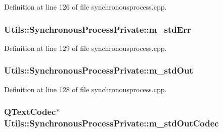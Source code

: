 Definition at line 126 of file synchronousprocess.\-cpp.

\hypertarget{struct_utils_1_1_synchronous_process_private_a91f0119521a74e8a136b01fee2e6bc2c}{
\subsubsection[{m\-\_\-std\-Err}]{ Utils\-::\-Synchronous\-Process\-Private\-::m\-\_\-std\-Err}}\label{struct_utils_1_1_synchronous_process_private_a91f0119521a74e8a136b01fee2e6bc2c}


Definition at line 129 of file synchronousprocess.\-cpp.

\hypertarget{struct_utils_1_1_synchronous_process_private_a619a54cc495542f58dba37ea569d02df}{
\subsubsection[{m\-\_\-std\-Out}]{ Utils\-::\-Synchronous\-Process\-Private\-::m\-\_\-std\-Out}}\label{struct_utils_1_1_synchronous_process_private_a619a54cc495542f58dba37ea569d02df}


Definition at line 128 of file synchronousprocess.\-cpp.

\hypertarget{struct_utils_1_1_synchronous_process_private_ae309539275cdf8ecf4189526058d2cb6}{
\subsubsection[{m\-\_\-std\-Out\-Codec}]{\setlength{\rightskip}{0pt plus 5cm}Q\-Text\-Codec$\ast$ Utils\-::\-Synchronous\-Process\-Private\-::m\-\_\-std\-Out\-Codec}}\label{struct_utils_1_1_synchronous_process_private_ae309539275cdf8ecf4189526058d2cb6}


